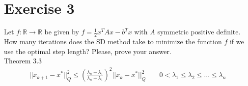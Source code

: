 \documentclass[unicode,11pt,a4paper,oneside,numbers=endperiod,openany]{scrartcl}
\newcommand{\myex}[1]{\begin{equation*}\begin{aligned} #1 \end{aligned}\end{equation*}}
\begin{document}





\section*{Exercise 3}
Let 
$f : \mathbb{R} \rightarrow \mathbb{R}$ 
be given by 
$f = \frac{1}{2} x^T Ax - b^T x$ 
with $A$ symmetric positive definite. 
How many iterations does the SD method take to minimize the function $f$ 
if we use the optimal step length? 
Please, prove your answer.
\\\newline
Theorem 3.3
\myex{
    ||x_{k+1} - x^*||_Q^2 \leq \left( \frac{\lambda_{n} - \lambda_{1}}{\lambda_{n} + \lambda_{1}} \right)^2 ||x_k - x^*||_Q^2
    \;\;\;\;\;\;\;
    0 < \lambda_1 \leq \lambda_2 \leq \ldots \leq \lambda_n
}
\end{document}
